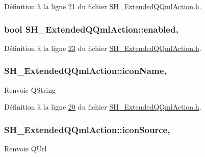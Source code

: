 Définition à la ligne \hyperlink{SH__ExtendedQQmlAction_8h_source_l00021}{21} du fichier \hyperlink{SH__ExtendedQQmlAction_8h_source}{S\-H\-\_\-\-Extended\-Q\-Qml\-Action.\-h}.

\hypertarget{classSH__ExtendedQQmlAction_ac2d51d5f8e6ee51883a8ea1efe974ad2}{
\subsubsection[{enabled}]{\setlength{\rightskip}{0pt plus 5cm}bool S\-H\-\_\-\-Extended\-Q\-Qml\-Action\-::enabled\hspace{0.3cm}{\ttfamily [read]}, {\ttfamily [write]}}}\label{classSH__ExtendedQQmlAction_ac2d51d5f8e6ee51883a8ea1efe974ad2}


Définition à la ligne \hyperlink{SH__ExtendedQQmlAction_8h_source_l00023}{23} du fichier \hyperlink{SH__ExtendedQQmlAction_8h_source}{S\-H\-\_\-\-Extended\-Q\-Qml\-Action.\-h}.

\hypertarget{classSH__ExtendedQQmlAction_a9107464c9df5a0ae59acd8ccbea7328a}{
\subsubsection[{icon\-Name}]{\setlength{\rightskip}{0pt plus 5cm}S\-H\-\_\-\-Extended\-Q\-Qml\-Action\-::icon\-Name\hspace{0.3cm}{\ttfamily [read]}, {\ttfamily [write]}}}\label{classSH__ExtendedQQmlAction_a9107464c9df5a0ae59acd8ccbea7328a}
\begin{DoxyReturn}{Renvoie}
Q\-String 
\end{DoxyReturn}


Définition à la ligne \hyperlink{SH__ExtendedQQmlAction_8h_source_l00020}{20} du fichier \hyperlink{SH__ExtendedQQmlAction_8h_source}{S\-H\-\_\-\-Extended\-Q\-Qml\-Action.\-h}.

\hypertarget{classSH__ExtendedQQmlAction_a569753d493f0ddc2fc0929e35268b4ff}{
\subsubsection[{icon\-Source}]{\setlength{\rightskip}{0pt plus 5cm}S\-H\-\_\-\-Extended\-Q\-Qml\-Action\-::icon\-Source\hspace{0.3cm}{\ttfamily [read]}, {\ttfamily [write]}}}\label{classSH__ExtendedQQmlAction_a569753d493f0ddc2fc0929e35268b4ff}
\begin{DoxyReturn}{Renvoie}
Q\-Url 
\end{DoxyReturn}


